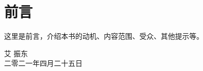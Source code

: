 \chapter*{前言}

这里是前言，介绍本书的动机、内容范围、受众、其他提示等。

\vskip 1.5cm

\begin{flushright}
艾 振东\\
二零二一年四月二十五日
\end{flushright}
